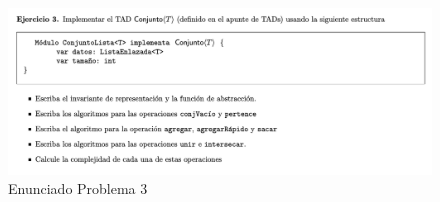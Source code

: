 \documentclass[10pt,a4paper]{article}
\begin{document}
\newpage

\begin{figure}[h]
  \centering
  \includegraphics[width=\textwidth]{images/nuevo_ejercicio_3.png}
  \caption{Enunciado Problema 3}
  \label{fig:ej_3}
\end{figure}
\vspace{1em}
\end{document}
